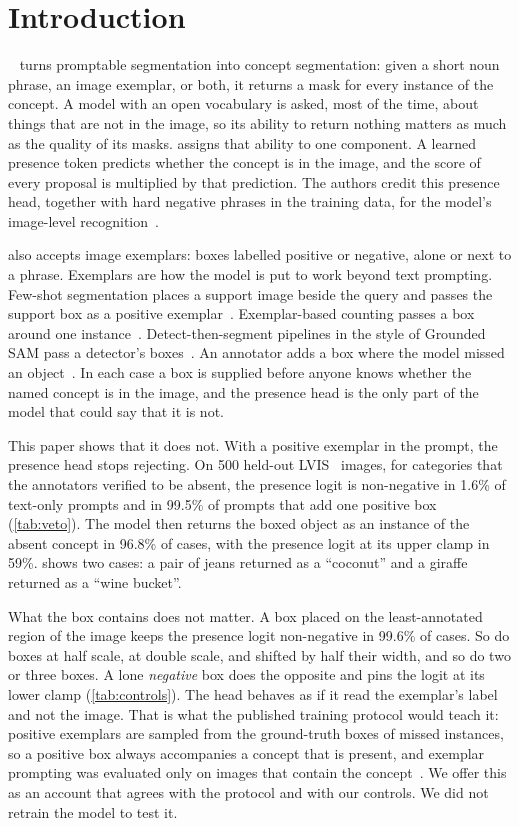 \section{Introduction}
\label{sec:intro}

\sam{}~\cite{carion2026sam3} turns promptable segmentation into concept segmentation: given a short noun phrase, an image exemplar, or both, it returns a mask for every instance of the concept.
A model with an open vocabulary is asked, most of the time, about things that are not in the image, so its ability to return nothing matters as much as the quality of its masks.
\sam{} assigns that ability to one component.
A learned presence token predicts whether the concept is in the image, and the score of every proposal is multiplied by that prediction.
The authors credit this presence head, together with hard negative phrases in the training data, for the model's image-level recognition~\cite{carion2026sam3}.

\sam{} also accepts image exemplars: boxes labelled positive or negative, alone or next to a phrase.
Exemplars are how the model is put to work beyond text prompting.
Few-shot segmentation places a support image beside the query and passes the support box as a positive exemplar~\cite{tsai2026fss,tsai2026case}.
Exemplar-based counting passes a box around one instance~\cite{ranjan2021fsc,amini2024countgd}.
Detect-then-segment pipelines in the style of Grounded SAM pass a detector's boxes~\cite{ren2024groundedsam}.
An annotator adds a box where the model missed an object~\cite{carion2026sam3}.
In each case a box is supplied before anyone knows whether the named concept is in the image, and the presence head is the only part of the model that could say that it is not.

This paper shows that it does not.
With a positive exemplar in the prompt, the presence head stops rejecting.
On 500 held-out LVIS~\cite{gupta2019lvis} images, for categories that the annotators verified to be absent, the presence logit is non-negative in 1.6\% of text-only prompts and in 99.5\% of prompts that add one positive box (\cref{tab:veto}).
The model then returns the boxed object as an instance of the absent concept in 96.8\% of cases, with the presence logit at its upper clamp in 59\%.
 shows two cases: a pair of jeans returned as a ``coconut'' and a giraffe returned as a ``wine bucket''.

What the box contains does not matter.
A box placed on the least-annotated region of the image keeps the presence logit non-negative in 99.6\% of cases.
So do boxes at half scale, at double scale, and shifted by half their width, and so do two or three boxes.
A lone \emph{negative} box does the opposite and pins the logit at its lower clamp (\cref{tab:controls}).
The head behaves as if it read the exemplar's label and not the image.
That is what the published training protocol would teach it: positive exemplars are sampled from the ground-truth boxes of missed instances, so a positive box always accompanies a concept that is present, and exemplar prompting was evaluated only on images that contain the concept~\cite{carion2026sam3}.
We offer this as an account that agrees with the protocol and with our controls.
We did not retrain the model to test it.

